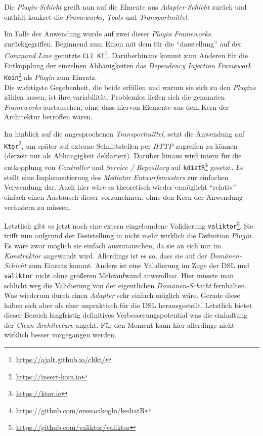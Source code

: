 Die \emph{Plugin-Schicht} greift nun auf die Elmente aus \emph{Adapter-Schicht} zurück und enthält konkret die \emph{Frameworks}, \emph{Tools} und \emph{Transportmittel}.

Im Falle der Anwendung wurde auf zwei dieser \emph{Plugin} \emph{Frameworks} zurückgegriffen. 
Beginnend zum Einen mit dem für die \enquote{darstellung} auf der \emph{Command Line} genutzte \texttt{CLI~KT}\footnote{\url{https://ajalt.github.io/clikt/}}.
Darüberhinaus kommt zum Anderen für die Entkopplung der einzelnen Abhänigkeiten das \emph{Dependency Injection} \emph{Framework} \texttt{Koin}\footnote{\url{https://insert-koin.io}} als \emph{Plugin} zum Einsatz.\\
Die wichtigste Gegebenheit, die beide erfüllen und warum sie sich zu den \emph{Plugins} zählen lassen, ist ihre variabilität.
Problemlos ließen sich die genannten \emph{Frameworks} austauschen, ohne dass hiervon Elemente aus dem Kern der Architektur betroffen wären.

Im hinblick auf die angesprochenen \emph{Transportmittel}, setzt die Anwendung auf \texttt{Ktor}\footnote{\url{https://ktor.io}}, um später auf externe Schnittstellen per \emph{HTTP} zugreifen zu können (derzeit nur als Abhängigkeit deklariert).
Darüber hinaus wird intern für die entkopplung von \emph{Controller} und \emph{Service / Repository} auf \texttt{kdiatR}\footnote{\url{https://github.com/enesacikoglu/kediatR}} gesetzt.
Es stellt eine Implementierung des \emph{Mediator} \emph{Entwurfsmusters} zur einfachen Verwendung dar.
Auch hier wäre es theoretisch wieder ermöglicht \enquote{relativ} einfach einen Austausch dieser vorzunehmen, ohne den Kern der Anwendung verändern zu müssen.

Letztlich gibt es jetzt noch eine extern eingebundene Validierung \texttt{valiktor}\footnote{\url{https://github.com/valiktor/valiktor}}.
Sie trifft nun aufgrund der Feststellung in  nicht mehr wirklich die Definition \emph{Plugin}.
Es wäre zwar möglich sie einfach auszutauschen, da sie an sich nur im \emph{Konstruktor} angewandt wird.
Allerdings ist es so, dass sie auf der \emph{Domänen-Schicht} zum Einsatz kommt.
Anders ist eine Validierung im Zuge der DSL und \texttt{valiktor} nicht ohne größeren Mehraufwand anwendbar.
Hier müsste man schlicht weg die Validierung von der eigentlichen \emph{Domänen-Schicht} fernhalten. 
Was wiederum durch einen \emph{Adapter} sehr einfach möglich wäre.
Gerade diese haben sich aber als eher unpraktisch für die DSL herausgestellt.
Letztlich bietet dieser Bereich langfristig definitives Verbesserungspotential was die einhaltung der \emph{Clean Architecture} angeht.
Für den Moment kann hier allerdings nicht wirklich besser vorgegangen werden.